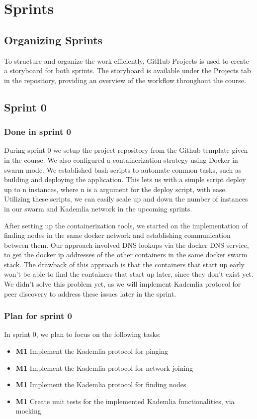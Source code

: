 \section{Sprints}

\subsection{Organizing Sprints}

To structure and organize the work efficiently, GitHub Projects is used to create a storyboard for both sprints. The storyboard is available under the 
Projects tab in the repository, providing an overview of the workflow throughout the course.

\subsection{Sprint 0}
\subsubsection{Done in sprint 0}
During sprint 0 we setup the project repository from the Github template given in the course. We also configured a containerization strategy using Docker in swarm mode. We established bash scripts to automate common tasks, such as building and deploying the application. This lets us with a simple script deploy up to n instances, where n is a argument for the deploy script, with ease. Utilizing these scripts, we can easily scale up and down the number of instances in our swarm and Kademlia network in the upcoming sprints.

After setting up the containerization tools, we started on the implementation of finding nodes in the same docker network and establishing communication between them. Our approach involved DNS lookups via the docker DNS service, to get the docker ip addresses of the other containers in the same docker swarm stack. The drawback of this approach is that the containers that start up early won't be able to find the containers that start up later, since they don't exist yet. We didn't solve this problem yet, as we will implement Kademlia protocol for peer discovery to address these issues later in the sprint.
    
\subsubsection{Plan for sprint 0}
In sprint 0, we plan to focus on the following tasks:
\begin{itemize}
    \item \textbf{M1} Implement the Kademlia protocol for pinging
    \item \textbf{M1} Implement the Kademlia protocol for network joining
    \item \textbf{M1} Implement the Kademlia protocol for finding nodes
    \item \textbf{M1} Create unit tests for the implemented Kademlia functionalities, via mocking
\end{itemize}

